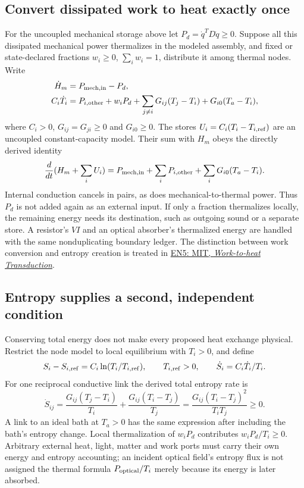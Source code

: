 \subsection{Convert dissipated work to heat exactly once}
For the uncoupled mechanical storage above let
$P_d=\dot q^TD\dot q\ge0$. Suppose all this dissipated mechanical power
thermalizes in the modeled assembly, and fixed or state-declared fractions
$w_i\ge0$, $\sum_iw_i=1$, distribute it among thermal nodes. Write
\begin{align}
 \dot H_m&=P_{\rm mech,in}-P_d,\\
 C_i\dot T_i&=P_{i,\rm other}+w_iP_d
       +\sum_{j\ne i}G_{ij}(T_j-T_i)+G_{i0}(T_a-T_i),
 \label{eq:r13-heat-transfer}
\end{align}
where $C_i>0$, $G_{ij}=G_{ji}\ge0$ and $G_{i0}\ge0$.
The stores $U_i=C_i(T_i-T_{i,\rm ref})$ are an uncoupled constant-capacity
model. Their sum with $H_m$ obeys the directly derived identity
\begin{equation}
 \frac{d}{dt}(H_m+\sum_iU_i)
 =P_{\rm mech,in}+\sum_iP_{i,\rm other}
                 +\sum_iG_{i0}(T_a-T_i).
 \label{eq:r13-total-transfer}
\end{equation}
Internal conduction cancels in pairs, as does mechanical-to-thermal power.
Thus $P_d$ is not added again as an external input. If only a fraction
thermalizes locally, the remaining energy needs its destination, such as
outgoing sound or a separate store. A resistor's $VI$ and an optical absorber's
thermalized energy are handled with the same nonduplicating boundary ledger.
The distinction between work conversion and entropy creation is treated in
\href{https://live.ocw.mit.edu/courses/2-141-modeling-and-simulation-of-dynamic-systems-fall-2006/1e6c6f7dd1e3033e1af593d1d28c1d6f_work_to_heat_tra.pdf}
{EN5: MIT, \emph{Work-to-heat Transduction}}.

\subsection{Entropy supplies a second, independent condition}
Conserving total energy does not make every proposed heat exchange physical.
Restrict the node model to local equilibrium with $T_i>0$, and define
\begin{equation}
 S_i-S_{i,\rm ref}=C_i\ln(T_i/T_{i,\rm ref}),\qquad
 T_{i,\rm ref}>0,\qquad \dot S_i=C_i\dot T_i/T_i.
\end{equation}
For one reciprocal conductive link the derived total entropy rate is
\begin{equation}
 \dot S_{ij}=\frac{G_{ij}(T_j-T_i)}{T_i}
          +\frac{G_{ij}(T_i-T_j)}{T_j}
       =\frac{G_{ij}(T_i-T_j)^2}{T_iT_j}\ge0 .
 \label{eq:r13-node-entropy}
\end{equation}
A link to an ideal bath at $T_a>0$ has the same expression after including
the bath's entropy change. Local thermalization of $w_iP_d$ contributes
$w_iP_d/T_i\ge0$. Arbitrary external heat, light, matter and work ports must
carry their own energy and entropy accounting; an incident optical field's
entropy flux is not assigned the thermal formula $P_{\rm optical}/T_i$ merely
because its energy is later absorbed.

